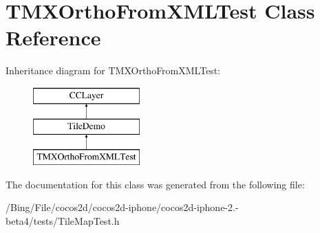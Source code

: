 \hypertarget{interface_t_m_x_ortho_from_x_m_l_test}{\section{T\-M\-X\-Ortho\-From\-X\-M\-L\-Test Class Reference}
\label{interface_t_m_x_ortho_from_x_m_l_test}
}
Inheritance diagram for T\-M\-X\-Ortho\-From\-X\-M\-L\-Test\-:\begin{figure}[H]
\begin{center}
\leavevmode
\includegraphics[height=3.000000cm]{interface_t_m_x_ortho_from_x_m_l_test}
\end{center}
\end{figure}


The documentation for this class was generated from the following file\-:\begin{DoxyCompactItemize}
\item 
/\-Bing/\-File/cocos2d/cocos2d-\/iphone/cocos2d-\/iphone-\/2.-\/beta4/tests/Tile\-Map\-Test.\-h\end{DoxyCompactItemize}
